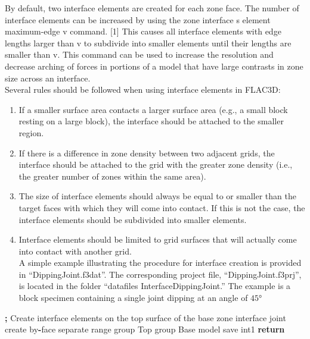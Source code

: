 \documentclass[a4paper, nobind]{templates/ociamthesis}
\providecommand{\tightlist}{%
  \setlength{\itemsep}{0pt}\setlength{\parskip}{0pt}}
\newenvironment{Shaded}{\begin{snugshade}}{\end{snugshade}}
\newcommand{\BuiltInTok}[1]{#1}
\newcommand{\ControlFlowTok}[1]{\textcolor[rgb]{0.13,0.29,0.53}{\textbf{#1}}}
\newcommand{\NormalTok}[1]{#1}
\newcommand{\OperatorTok}[1]{\textcolor[rgb]{0.81,0.36,0.00}{\textbf{#1}}}
\newcommand{\StringTok}[1]{\textcolor[rgb]{0.31,0.60,0.02}{#1}}
\renewenvironment{Shaded}
{
  \vspace{10pt}%
  \begin{snugshade}%
}{%
  \end{snugshade}%
  \vspace{8pt}%
}
\begin{document}
By default, two interface elements are created for each zone face. The
number of interface elements can be increased by using the zone
interface s element maximum-edge v command. {[}1{]} This causes all
interface elements with edge lengths larger than v to subdivide into
smaller elements until their lengths are smaller than v. This command
can be used to increase the resolution and decrease arching of forces in
portions of a model that have large contrasts in zone size across an
interface.\\

Several rules should be followed when using interface elements in
FLAC3D:\\

\begin{enumerate}
\def\labelenumi{\arabic{enumi}.}
\tightlist
\item
  If a smaller surface area contacts a larger surface area (e.g., a
  small block resting on a large block), the interface should be
  attached to the smaller region.\\
\item
  If there is a difference in zone density between two adjacent grids,
  the interface should be attached to the grid with the greater zone
  density (i.e., the greater number of zones within the same area).
\item
  The size of interface elements should always be equal to or smaller
  than the target faces with which they will come into contact. If
  this is not the case, the interface elements should be subdivided
  into smaller elements.\\
\item
  Interface elements should be limited to grid surfaces that will
  actually come into contact with another grid.\\
  A simple example illustrating the procedure for interface creation
  is provided in ``DippingJoint.f3dat''. The corresponding project file,
  ``DippingJoint.f3prj'', is located in the folder ``datafiles
  InterfaceDippingJoint.'' The example is a block specimen containing a
  single joint dipping at an angle of \(45°\)
\end{enumerate}

\begin{Shaded}
\begin{Highlighting}[]
\OperatorTok{;}\NormalTok{ Create interface elements on the top surface of the base        }
\NormalTok{zone interface }\StringTok{\textquotesingle{}joint\textquotesingle{}}\NormalTok{ create by}\OperatorTok{{-}}\NormalTok{face separate }\BuiltInTok{range}\NormalTok{ group }\StringTok{\textquotesingle{}Top\textquotesingle{}}\NormalTok{ group }\StringTok{\textquotesingle{}Base\textquotesingle{}}
\NormalTok{model save }\StringTok{\textquotesingle{}int1\textquotesingle{}}
\ControlFlowTok{return}
\end{Highlighting}
\end{Shaded}
\end{document}
